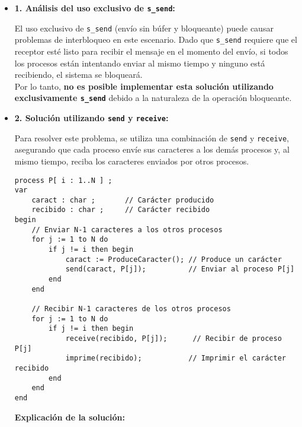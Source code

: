 \documentclass[a4paper,12pt]{article}
\begin{document}
\begin{itemize} 

\item \textbf{1. Análisis del uso exclusivo de \texttt{s\_send}:}

El uso exclusivo de \texttt{s\_send} (envío sin búfer y bloqueante) puede causar problemas de interbloqueo en este escenario. Dado que \texttt{s\_send} requiere que el receptor esté listo para recibir el mensaje en el momento del envío, si todos los procesos están intentando enviar al mismo tiempo y ninguno está recibiendo, el sistema se bloqueará.\\

Por lo tanto, \textbf{no es posible implementar esta solución utilizando exclusivamente \texttt{s\_send}} debido a la naturaleza de la operación bloqueante.\\


\item  \textbf{2. Solución utilizando \texttt{send} y \texttt{receive}:}

Para resolver este problema, se utiliza una combinación de \texttt{send} y \texttt{receive}, asegurando que cada proceso envíe sus caracteres a los demás procesos y, al mismo tiempo, reciba los caracteres enviados por otros procesos.\\

\begin{lstlisting}[style=customcpp]
process P[ i : 1..N ] ;
var
    caract : char ;       // Carácter producido
    recibido : char ;     // Carácter recibido
begin
    // Enviar N-1 caracteres a los otros procesos
    for j := 1 to N do
        if j != i then begin
            caract := ProduceCaracter(); // Produce un carácter
            send(caract, P[j]);          // Enviar al proceso P[j]
        end
    end

    // Recibir N-1 caracteres de los otros procesos
    for j := 1 to N do
        if j != i then begin
            receive(recibido, P[j]);      // Recibir de proceso P[j]
            imprime(recibido);           // Imprimir el carácter recibido
        end
    end
end
\end{lstlisting}

\textbf{Explicación de la solución:}


\end{itemize}
\end{document}
